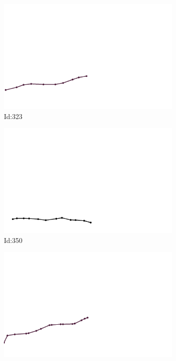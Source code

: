 \documentclass[12pt,twoside]{report}
\begin{document}
\begin{figure}
\centering
\begin{subfigure}[b]{0.20\textwidth}
\centering
\includegraphics[width=\textwidth]{../../trajectories/323.png}
\caption{Id:323}
\end{subfigure}
\begin{subfigure}[b]{0.20\textwidth}
\centering
\includegraphics[width=\textwidth]{../../trajectories/350.png}
\caption{Id:350}
\end{subfigure}
\begin{subfigure}[b]{0.20\textwidth}
\centering
\includegraphics[width=\textwidth]{../../trajectories/606.png}

\end{subfigure}
\end{figure}
\end{document}
